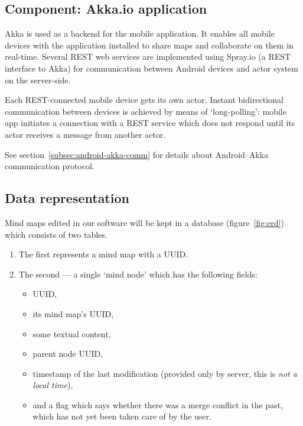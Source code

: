 
\subsection{Component: Akka.io application}
\label{subsec:component-akka}


Akka is used as a backend for the mobile application. It enables all mobile devices with the application installed to share maps and collaborate on them in real-time. Several REST web services are implemented using Spray.io (a REST interface to Akka) for communication between Android devices and actor system on the server-side.

Each REST-connected mobile device gets its own actor. Instant bidirectional communication between devices is achieved by means of `long-polling': mobile app initiates a connection with a REST service which does not respond until its actor receives a message from another actor.

See  section~\ref{subsec:android-akka-comm} for details about Android--Akka communication protocol.



\subsection{Data representation}
\label{subsec:data-repr}

Mind maps edited in our software will be kept in a database (figure~\ref{fig:erd}) which consists of two tables.

\begin{enumerate}
	\item The first represents a mind map with a UUID.
	\item The second --- a single `mind node' which has the following fields: \begin{itemize}
		\item UUID,
		\item its mind map's UUID,
		\item some textual content,
		\item parent node UUID,
		\item timestamp of the last modification (provided only by server, this is \emph{not a local time}),
		\item and a flag which says whether there was a merge conflict in the past, which has not yet been taken care of by the user.
	\end{itemize}
\end{enumerate}

